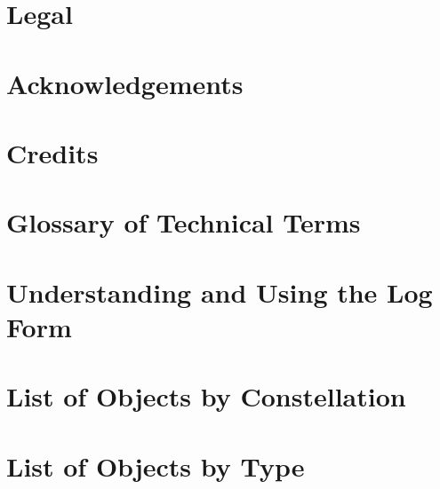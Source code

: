 \documentclass[a4paper,oneside]{book}
\begin{document}
\author{The Astronomy Logbook Project}



\chapter{Legal}
\label{Legal}



\chapter{Acknowledgements}



\chapter{Credits}



\mainmatter

\chapter{Glossary of Technical Terms}



\chapter{Understanding and Using the Log Form}




\twocolumn
\chapter{List of Objects by Constellation}



\chapter{List of Objects by Type}



\end{document}
